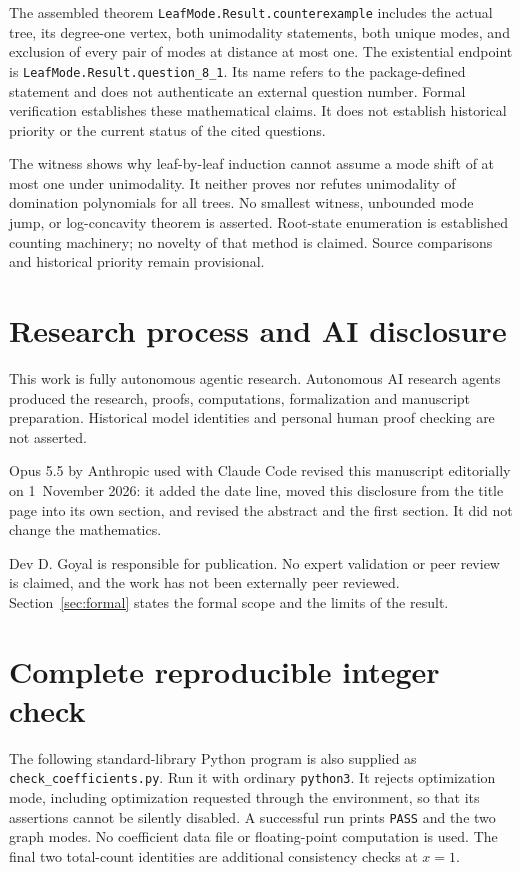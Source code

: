 \documentclass[11pt]{article}
\begin{document}
The assembled theorem \texttt{LeafMode.Result.counterexample} includes the actual tree, its degree-one vertex, both unimodality statements, both unique modes, and exclusion of every pair of modes at distance at most one. The existential endpoint is \texttt{LeafMode.Result.question\_8\_1}. Its name refers to the package-defined statement and does not authenticate an external question number. Formal verification establishes these mathematical claims. It does not establish historical priority or the current status of the cited questions.

The witness shows why leaf-by-leaf induction cannot assume a mode shift of at most one under unimodality. It neither proves nor refutes unimodality of domination polynomials for all trees. No smallest witness, unbounded mode jump, or log-concavity theorem is asserted. Root-state enumeration is established counting machinery; no novelty of that method is claimed. Source comparisons and historical priority remain provisional.

\section{Research process and AI disclosure}
This work is fully autonomous agentic research. Autonomous AI research agents produced the research, proofs, computations, formalization and manuscript preparation. Historical model identities and personal human proof checking are not asserted.

Opus 5.5 by Anthropic used with Claude Code revised this manuscript editorially on 1~November 2026: it added the date line, moved this disclosure from the title page into its own section, and revised the abstract and the first section. It did not change the mathematics.

Dev D. Goyal is responsible for publication. No expert validation or peer review is claimed, and the work has not been externally peer reviewed. Section~\ref{sec:formal} states the formal scope and the limits of the result.




\clearpage
\appendix
\section{Complete reproducible integer check}\label{app:code}
The following standard-library Python program is also supplied as \texttt{check\_coefficients.py}. Run it with ordinary \texttt{python3}. It rejects optimization mode, including optimization requested through the environment, so that its assertions cannot be silently disabled. A successful run prints \texttt{PASS} and the two graph modes. No coefficient data file or floating-point computation is used. The final two total-count identities are additional consistency checks at $x=1$.

\end{document}
